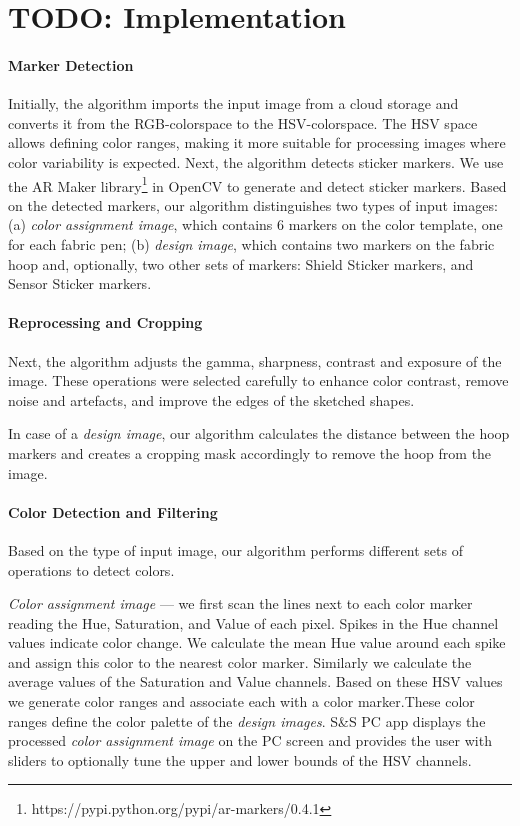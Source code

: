 \section{TODO: Implementation}


\paragraph{Marker Detection}
Initially, the algorithm imports the input image from a cloud storage and converts it from the RGB-colorspace to the HSV-colorspace. The HSV space allows defining color ranges, making it more suitable for processing images where color variability is expected. Next, the algorithm detects sticker markers. We use the AR Maker library\footnote{https://pypi.python.org/pypi/ar-markers/0.4.1} in OpenCV to generate and detect sticker markers. Based on the detected markers, our algorithm distinguishes two types of input images: (a) \textit{color assignment image}, which contains 6 markers on the color template, one for each fabric pen; (b) \textit{design image}, which contains two markers on the fabric hoop and, optionally, two other sets of markers: Shield Sticker markers, and Sensor Sticker markers. 

\paragraph{Reprocessing and Cropping}
Next, the algorithm adjusts the gamma, sharpness, contrast and exposure of the image. These operations were selected carefully to enhance color contrast, remove noise and artefacts, and improve the edges of the sketched shapes. 

In case of a \textit{design image}, our algorithm calculates the distance between the hoop markers and creates a cropping mask accordingly to remove the hoop from the image.

\paragraph{Color Detection and Filtering}
Based on the type of input image, our algorithm performs different sets of operations to detect colors.

\textit{Color assignment image} --- we first scan the lines next to each color marker reading the Hue, Saturation, and Value of each pixel. Spikes in the Hue channel values indicate color change. We calculate the mean Hue value around each spike and assign this color to the nearest color marker. Similarly we calculate the average values of the Saturation and Value channels. Based on these HSV values we generate color ranges and associate each with a color marker.These color ranges define the color palette of the \textit{design images}. S\&S PC app displays the processed \textit{color assignment image} on the PC screen and provides the user with sliders to optionally tune the upper and lower bounds of the HSV channels. 


